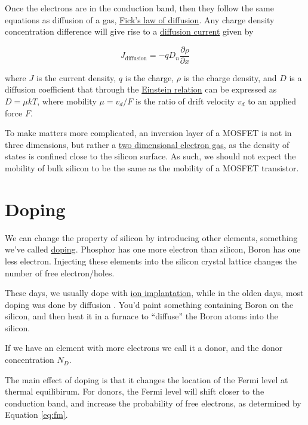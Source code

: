 Once the electrons are in the conduction band, then they follow the same
equations as diffusion of a gas,
\href{https://en.wikipedia.org/wiki/Fick\%27s_laws_of_diffusion}{Fick's
law of diffusion}. Any charge density concentration difference will give
rise to a
\href{https://en.wikipedia.org/wiki/Diffusion_current}{diffusion
current} given by

\begin{equation}
\tag{4}
\label{eq:diff}
J_{\text{diffusion}} = - qD_n \frac{\partial \rho}{\partial x}
\end{equation}

where \(J\) is the current density, \(q\) is the charge, \(\rho\) is the
charge density, and \(D\) is a diffusion coefficient that through the
\href{https://en.wikipedia.org/wiki/Diffusion_current}{Einstein
relation} can be expressed as \(D = \mu k T\), where mobility
\(\mu = v_d/F\) is the ratio of drift velocity \(v_d\) to an applied
force \(F\).

To make matters more complicated, an inversion layer of a MOSFET is not
in three dimensions, but rather a
\href{https://en.wikipedia.org/wiki/Two-dimensional_electron_gas}{two
dimensional electron gas}, as the density of states is confined close to
the silicon surface. As such, we should not expect the mobility of bulk
silicon to be the same as the mobility of a MOSFET transistor.

\section{Doping}\label{doping}

We can change the property of silicon by introducing other elements,
something we've called
\href{https://en.wikipedia.org/wiki/Doping_(semiconductor)}{doping}.
Phosphor has one more electron than silicon, Boron has one less
electron. Injecting these elements into the silicon crystal lattice
changes the number of free electron/holes.

These days, we usually dope with
\href{https://en.wikipedia.org/wiki/Ion_implantation}{ion implantation},
while in the olden days, most doping was done by diffusion
. You'd paint something containing
Boron on the silicon, and then heat it in a furnace to ``diffuse'' the
Boron atoms into the silicon.

If we have an element with more electrons we call it a donor, and the
donor concentration \(N_{D}\).

The main effect of doping is that it changes the location of the Fermi
level at thermal equilibirum. For donors, the Fermi level will shift
closer to the conduction band, and increase the probability of free
electrons, as determined by Equation \eqref{eq:fm}.

